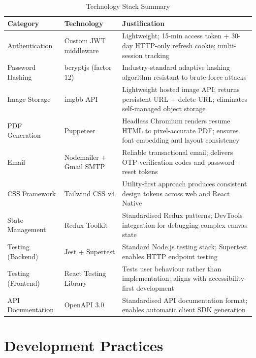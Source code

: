 \documentclass[12pt, a4paper, oneside]{report}
\begin{document}
\begin{table}[H]
\centering
\caption{Technology Stack Summary}
\label{tab:tech_stack}
\renewcommand{\arraystretch}{1.5}
\begin{tabularx}{\textwidth}{|p{3.5cm}|p{3.5cm}|X|}
\hline
\textbf{Category} & \textbf{Technology} & \textbf{Justification} \\
\hline
Authentication & Custom JWT middleware \cite{jwt2015} & Lightweight; 15-min access token + 30-day HTTP-only refresh cookie; multi-session tracking \\
\hline
Password Hashing & bcryptjs \cite{bcrypt1999} (factor 12) & Industry-standard adaptive hashing algorithm resistant to brute-force attacks \\
\hline
Image Storage & imgbb API \cite{imgbb2024} & Lightweight hosted image API; returns persistent URL + delete URL; eliminates self-managed object storage \\
\hline
PDF Generation & Puppeteer \cite{puppeteer2024} & Headless Chromium renders resume HTML to pixel-accurate PDF; ensures font embedding and layout consistency \\
\hline
Email & Nodemailer + Gmail SMTP & Reliable transactional email; delivers OTP verification codes and password-reset tokens \\
\hline
CSS Framework & Tailwind CSS v4 \cite{tailwind2024} & Utility-first approach produces consistent design tokens across web and React Native \\
\hline
State Management & Redux Toolkit \cite{reduxtoolkit2024} & Standardised Redux patterns; DevTools integration for debugging complex canvas state \\
\hline
Testing (Backend) & Jest + Supertest & Standard Node.js testing stack; Supertest enables HTTP endpoint testing \\
\hline
Testing (Frontend) & React Testing Library & Tests user behaviour rather than implementation; aligns with accessibility-first development \\
\hline
API Documentation & OpenAPI 3.0 \cite{openapi2021} & Standardised API documentation format; enables automatic client SDK generation \\
\hline
\end{tabularx}
\end{table}

\section{Development Practices}
\end{document}
